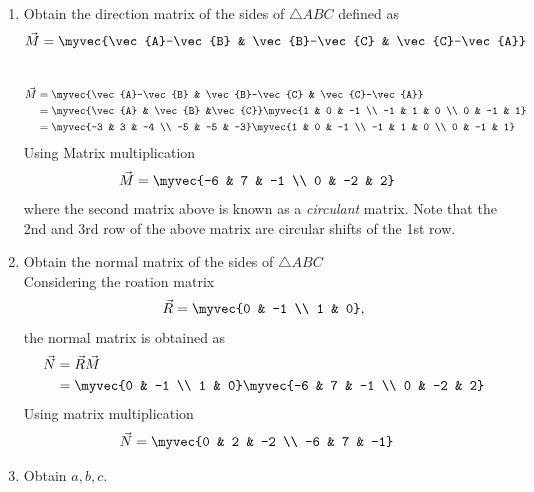 \documentclass[11pt]{book}
\begin{document}
\begin{enumerate}[label=\thesubsection.\arabic*.,ref=\thesubsection.\theenumi]
\item Obtain the direction matrix of the sides of $\triangle ABC$ defined as 
\begin{align}
\vec{M} = 	\myvec{\vec{A}-\vec{B} & \vec{B}-\vec{C} & \vec{C}-\vec{A}}
\end{align}
\\
\solution 
\begin{align}
\vec{M} &= \myvec{\vec{A}-\vec{B} & \vec{B}-\vec{C} & \vec{C}-\vec{A}} \\
	&= \myvec{\vec{A} & \vec{B} &\vec{C}} \myvec{1 & 0 & -1 \\ -1 & 1 & 0 \\ 0 & -1 & 1} \\
 &=\myvec{-3 & 3 & -4 \\ -5 & -5 & -3}\myvec{1 & 0 & -1 \\ -1 & 1 & 0 \\ 0 & -1 & 1} 
 \end{align}
 Using Matrix multiplication
 \begin{align}
 \vec{M} &=\myvec{-6 & 7 & -1 \\ 0 & -2 & 2}
\end{align}
where the second matrix above is known as a {\em circulant} matrix.  Note that the 2nd and 3rd row of the above matrix are circular shifts of the 1st row.
\item Obtain the normal matrix  of the sides of $\triangle ABC$ \\
\solution Considering the roation matrix
\begin{align}
\vec{R}  = \myvec{0 & -1 \\ 1 & 0},
\end{align}
the normal matrix is obtained as
\begin{align}
\vec{N} &= \vec{R}\vec{M}  \\
&=\myvec{0 & -1 \\ 1 & 0}\myvec{-6 & 7 & -1 \\ 0 & -2 & 2} 
\end{align}
Using matrix multiplication 
\begin{align}
   \vec{N} &= \myvec{0 & 2 & -2 \\ -6 & 7 & -1}
\end{align}
\item Obtain $a, b, c$. \\

\end{enumerate}
\end{document}
